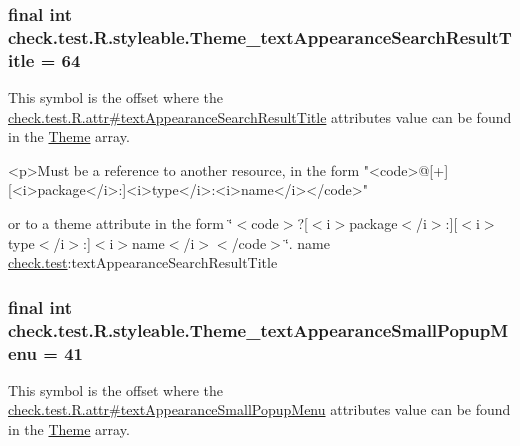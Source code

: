 \subsubsection[{Theme\+\_\+text\+Appearance\+Search\+Result\+Title}]{\setlength{\rightskip}{0pt plus 5cm}final int check.\+test.\+R.\+styleable.\+Theme\+\_\+text\+Appearance\+Search\+Result\+Title = 64\hspace{0.3cm}{\ttfamily [static]}}\label{classcheck_1_1test_1_1_r_1_1styleable_aad7da0b4a2302f6cd5981784f6507c2d}
This symbol is the offset where the \hyperlink{classcheck_1_1test_1_1_r_1_1attr_a13a9931a99a930b514fe408c215c4cd6}{check.\+test.\+R.\+attr\#text\+Appearance\+Search\+Result\+Title} attribute\textquotesingle{}s value can be found in the \hyperlink{classcheck_1_1test_1_1_r_1_1styleable_acca726d02016a0cf607782ec3a436a81}{Theme} array.

\begin{DoxyVerb}      <p>Must be a reference to another resource, in the form "<code>@[+][<i>package</i>:]<i>type</i>:<i>name</i></code>"
\end{DoxyVerb}
 or to a theme attribute in the form \char`\"{}$<$code$>$?\mbox{[}$<$i$>$package$<$/i$>$\+:\mbox{]}\mbox{[}$<$i$>$type$<$/i$>$\+:\mbox{]}$<$i$>$name$<$/i$>$$<$/code$>$\char`\"{}.  name \hyperlink{namespacecheck_1_1test}{check.\+test}\+:text\+Appearance\+Search\+Result\+Title \hypertarget{classcheck_1_1test_1_1_r_1_1styleable_a5d74a42ce30244146c66202e8a63600e}{}
\subsubsection[{Theme\+\_\+text\+Appearance\+Small\+Popup\+Menu}]{\setlength{\rightskip}{0pt plus 5cm}final int check.\+test.\+R.\+styleable.\+Theme\+\_\+text\+Appearance\+Small\+Popup\+Menu = 41\hspace{0.3cm}{\ttfamily [static]}}\label{classcheck_1_1test_1_1_r_1_1styleable_a5d74a42ce30244146c66202e8a63600e}
This symbol is the offset where the \hyperlink{classcheck_1_1test_1_1_r_1_1attr_a8b92407d50d5bf64b97cf69cd93cfc6e}{check.\+test.\+R.\+attr\#text\+Appearance\+Small\+Popup\+Menu} attribute\textquotesingle{}s value can be found in the \hyperlink{classcheck_1_1test_1_1_r_1_1styleable_acca726d02016a0cf607782ec3a436a81}{Theme} array.

